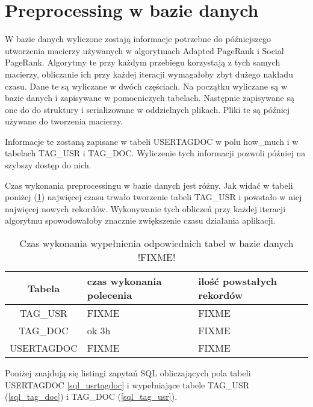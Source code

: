 



\section{Preprocessing w bazie danych}

W bazie danych wyliczone zostają informacje potrzebne do późniejszego utworzenia macierzy używanych w algorytmach Adapted PageRank i Social PageRank. Algorytmy te przy każdym przebiegu korzystają z tych samych macierzy, obliczanie ich przy każdej iteracji wymagałoby zbyt dużego nakładu czasu. Dane te są wyliczane w dwóch częściach. Na początku wyliczane są w bazie danych i zapisywane w pomocniczych tabelach. Następnie zapisywane są one do do struktury i serializowane w oddzielnych plikach. Pliki te są później używane do tworzenia macierzy.

Informacje te zostaną zapisane w tabeli USERTAGDOC w polu how\_much i w tabelach TAG\_USR i TAG\_DOC. Wyliczenie tych informacji pozwoli później na szybszy dostęp do nich.

Czas wykonania preprocessingu w bazie danych jest różny. Jak widać w tabeli poniżej (\ref{tab:czas_tabele}) najwięcej czasu trwało tworzenie tabeli TAG\_USR i powstało w niej najwięcej nowych rekordów. Wykonywanie tych obliczeń przy każdej iteracji algorytmu spowodowałoby znacznie zwiększenie czasu działania aplikacji.

\begin{table}[hbp]
  \centering
    \begin{tabular}{ | c | p{3cm}| p{3cm} | }
    \hline
    Tabela & czas wykonania polecenia & ilość powstałych rekordów  \\ 
    \hline
    TAG\_USR & FIXME & FIXME   \\ 
    \hline
    TAG\_DOC & ok 3h &  FIXME  \\ 
    \hline
    USERTAGDOC & FIXME  & FIXME  \\ 
    \hline
    \end{tabular}
     \caption{Czas wykonania wypełnienia odpowiednich tabel w bazie danych !FIXME!}
    \label{tab:czas_tabele}
   
\end{table}


Poniżej znajdują się listingi zapytań SQL obliczających pola tabeli USERTAGDOC \ref{sql_usrtagdoc} i wypełniające tabele TAG\_USR (\ref{sql_tag_doc}) i TAG\_DOC (\ref{sql_tag_usr}). 


